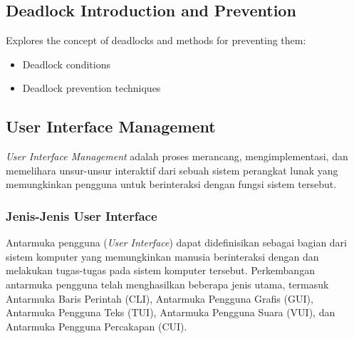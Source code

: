 \documentclass[12pt]{article}
\begin{document}
\subsection{Deadlock Introduction and Prevention}
Explores the concept of deadlocks and methods for preventing them:
\begin{itemize}
    \item Deadlock conditions
    \item Deadlock prevention techniques
\end{itemize}

\subsection{User Interface Management}


\textit{User Interface Management} adalah proses merancang, mengimplementasi, dan memelihara unsur-unsur interaktif dari sebuah sistem perangkat lunak yang memungkinkan pengguna untuk berinteraksi dengan fungsi sistem tersebut.

\subsubsection{Jenis-Jenis User Interface}
\par Antarmuka pengguna (\textit{User Interface}) dapat didefinisikan sebagai bagian dari sistem komputer yang memungkinkan manusia berinteraksi dengan dan melakukan tugas-tugas pada sistem komputer tersebut. Perkembangan antarmuka pengguna telah menghasilkan beberapa jenis utama, termasuk Antarmuka Baris Perintah (CLI), Antarmuka Pengguna Grafis (GUI), Antarmuka Pengguna Teks (TUI), Antarmuka Pengguna Suara (VUI), dan Antarmuka Pengguna Percakapan (CUI). 
\end{document}
